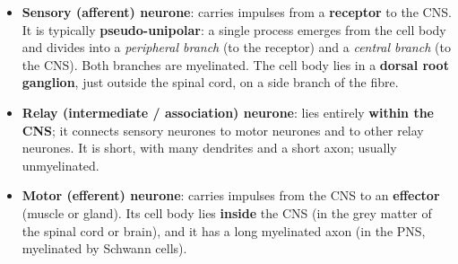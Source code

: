 \documentclass[11pt]{article}
\begin{document}
\begin{definition}
\begin{itemize}
\item \textbf{Sensory (afferent) neurone}: carries impulses from a \textbf{receptor} to the CNS. It is typically \textbf{pseudo-unipolar}: a single process emerges from the cell body and divides into a \emph{peripheral branch} (to the receptor) and a \emph{central branch} (to the CNS). Both branches are myelinated. The cell body lies in a \textbf{dorsal root ganglion}, just outside the spinal cord, on a side branch of the fibre.
\item \textbf{Relay (intermediate / association) neurone}: lies entirely \textbf{within the CNS}; it connects sensory neurones to motor neurones and to other relay neurones. It is short, with many dendrites and a short axon; usually unmyelinated.
\item \textbf{Motor (efferent) neurone}: carries impulses from the CNS to an \textbf{effector} (muscle or gland). Its cell body lies \textbf{inside} the CNS (in the grey matter of the spinal cord or brain), and it has a long myelinated axon (in the PNS, myelinated by Schwann cells).
\end{itemize}
\end{definition}
\end{document}
